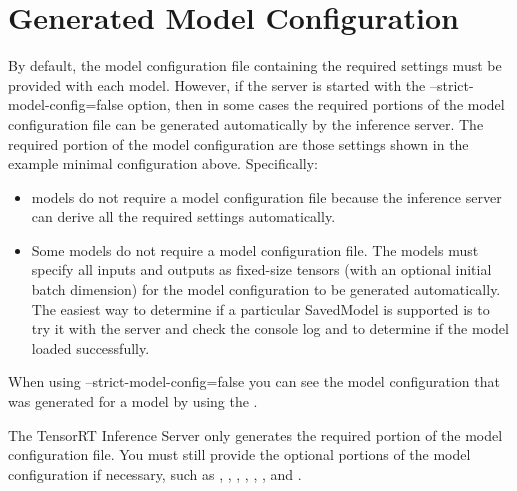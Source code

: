 \documentclass[letterpaper,10pt,english]{sphinxmanual}
\begin{document}
\section{Generated Model Configuration}
\label{\detokenize{model_configuration:generated-model-configuration}}\label{\detokenize{model_configuration:section-generated-model-configuration}}
By default, the model configuration file containing the required
settings must be provided with each model. However, if the server is
started with the --strict-model-config=false option, then in some
cases the required portions of the model configuration file can be
generated automatically by the inference server. The required portion
of the model configuration are those settings shown in the example
minimal configuration above. Specifically:
\begin{itemize}
\item {} 
{\hyperref[\detokenize{model_repository:section-tensorrt-models}]{}} models do not require
a model configuration file because the inference server can derive
all the required settings automatically.

\item {} 
Some {\hyperref[\detokenize{model_repository:section-tensorflow-models}]{}} models
do not require a model configuration file. The models must specify
all inputs and outputs as fixed-size tensors (with an optional
initial batch dimension) for the model configuration to be generated
automatically. The easiest way to determine if a particular
SavedModel is supported is to try it with the server and check the
console log and {\hyperref[\detokenize{http_grpc_api:section-api-status}]{}} to determine
if the model loaded successfully.

\end{itemize}

When using --strict-model-config=false you can see the model
configuration that was generated for a model by using the {\hyperref[\detokenize{http_grpc_api:section-api-status}]{}}.

The TensorRT Inference Server only generates the required portion of
the model configuration file. You must still provide the optional
portions of the model configuration if necessary, such as
,
,
,
,
,
, and
.
\end{document}
